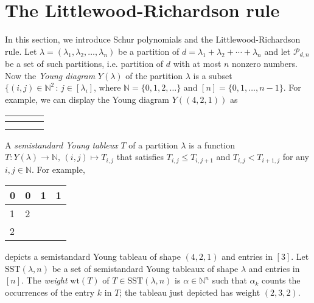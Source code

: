\documentclass{article}
\newcommand{\SST}{\mathrm{SST}}
\newcommand{\wt}{\mathrm{wt}}
\begin{document}
\section{The Littlewood-Richardson rule}
In this section, we introduce Schur polynomials and the Littlewood-Richardson rule. Let $\lambda = (\lambda_{1}, \lambda_{2}, \dots, \lambda_{n})$ be a partition of $d = \lambda_{1} + \lambda_{2} + \cdots + \lambda_{n}$ and let $\mathcal{P}_{d, n}$ be a set of such partitions, i.e. partition of $d$ with at most $n$ nonzero numbers. 
Now the \emph{Young diagram} $Y(\lambda)$ of the partition $\lambda$ is a subset $\{(i, j)\in \mathbb{N}^{2}\,:\, j\in [\lambda_{i}]$, where $\mathbb{N} = \{0, 1, 2, \dots\}$ and $[n] = \{0, 1, \dots, n-1\}$. For example, we can display the Young diagram $Y((4, 2, 1))$ as
\begin{center}
\begin{tabular}{|l|lll}
\hline
 & \multicolumn{1}{l|}{} & \multicolumn{1}{l|}{} & \multicolumn{1}{l|}{} \\ \hline
 & \multicolumn{1}{l|}{} &                       &                       \\ \cline{1-2}
 &                       &                       &                       \\ \cline{1-1}
\end{tabular}
\end{center}
A \emph{semistandard Young tableux} $T$ of a partition $\lambda$ is a function $T:Y(\lambda)\to \mathbb{N}, \, (i, j)\mapsto T_{i, j}$ that satisfies $T_{i, j} \leq T_{i, j+1}$ and $T_{i, j} < T_{i+1, j}$ for any $i, j\in \mathbb{N}$. 
For example, 
\begin{center}
\begin{tabular}{|l|lll}
\hline
0 & \multicolumn{1}{l|}{0} & \multicolumn{1}{l|}{1} & \multicolumn{1}{l|}{1} \\ \hline
1 & \multicolumn{1}{l|}{2} &                        &                        \\ \cline{1-2}
2 &                        &                        &                        \\ \cline{1-1}
\end{tabular}
\end{center}
depicts a semistandard Young tableau of shape $(4, 2, 1)$ and entries in $[3]$. Let $\SST(\lambda, n)$ be a set of semistandard Young tableaux of shape $\lambda$ and entries in $[n]$. The \emph{weight} $\wt(T)$ of $T\in \SST(\lambda, n)$ is $\alpha\in \mathbb{N}^{n}$ such that $\alpha_{k}$ counts the occurrences of the entry $k$ in $T$; the tableau just depicted has weight $(2, 3, 2)$. 
\end{document}
